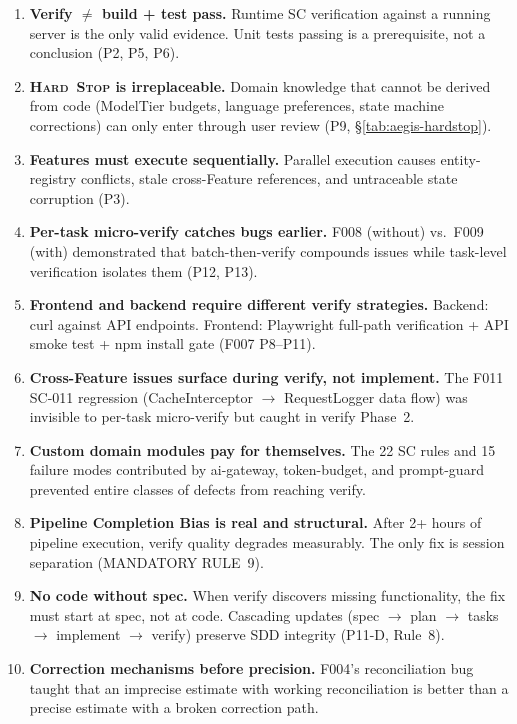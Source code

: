 \documentclass[11pt,a4paper,openright,twoside]{report}
\newcommand{\hardstop}{\textsc{Hard~Stop}}
\begin{document}
\begin{enumerate}[nosep]
  \item \textbf{Verify $\neq$ build + test pass.} Runtime SC verification against a running server is the only valid evidence. Unit tests passing is a prerequisite, not a conclusion (P2, P5, P6).
  \item \textbf{\hardstop{} is irreplaceable.} Domain knowledge that cannot be derived from code (ModelTier budgets, language preferences, state machine corrections) can only enter through user review (P9, \S\ref{tab:aegis-hardstop}).
  \item \textbf{Features must execute sequentially.} Parallel execution causes entity-registry conflicts, stale cross-Feature references, and untraceable state corruption (P3).
  \item \textbf{Per-task micro-verify catches bugs earlier.} F008 (without) vs.\ F009 (with) demonstrated that batch-then-verify compounds issues while task-level verification isolates them (P12, P13).
  \item \textbf{Frontend and backend require different verify strategies.} Backend: curl against API endpoints. Frontend: Playwright full-path verification + API smoke test + npm install gate (F007 P8--P11).
  \item \textbf{Cross-Feature issues surface during verify, not implement.} The F011 SC-011 regression (CacheInterceptor $\to$ RequestLogger data flow) was invisible to per-task micro-verify but caught in verify Phase~2.
  \item \textbf{Custom domain modules pay for themselves.} The 22 SC rules and 15 failure modes contributed by ai-gateway, token-budget, and prompt-guard prevented entire classes of defects from reaching verify.
  \item \textbf{Pipeline Completion Bias is real and structural.} After 2+ hours of pipeline execution, verify quality degrades measurably. The only fix is session separation (MANDATORY RULE~9).
  \item \textbf{No code without spec.} When verify discovers missing functionality, the fix must start at spec, not at code. Cascading updates (spec $\to$ plan $\to$ tasks $\to$ implement $\to$ verify) preserve SDD integrity (P11-D, Rule~8).
  \item \textbf{Correction mechanisms before precision.} F004's reconciliation bug taught that an imprecise estimate with working reconciliation is better than a precise estimate with a broken correction path.
\end{enumerate}
\end{document}

